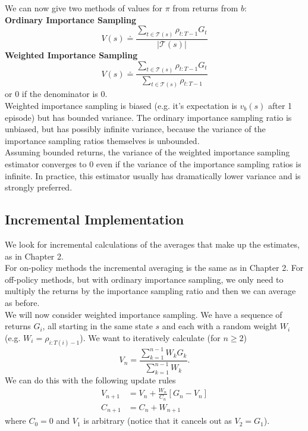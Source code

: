 We can now give two methods of values for $\pi$ from returns from $b$:\\
{\bfseries{Ordinary Importance Sampling}}
\begin{equation}
    V(s) \doteq \frac{\sum_{t\in \mathcal{T}(s)} \rho_{t:T-1}G_t}{|\mathcal{T}(s)|}
\end{equation}
{\bfseries{Weighted Importance Sampling}}
\begin{equation}
    V(s) \doteq \frac{\sum_{t\in \mathcal{T}(s)} \rho_{t:T-1}G_t}{\sum_{t\in \mathcal{T}(s)} \rho_{t:T-1}}
\end{equation}
or 0 if the denominator is 0.\\

Weighted importance sampling is biased (e.g. it's expectation is $v_b(s)$ after 1 episode) but has bounded variance. The ordinary importance sampling ratio is unbiased, but has possibly infinite variance, because the variance of the importance sampling ratios themselves is unbounded.\\

Assuming bounded returns, the variance of the weighted importance sampling estimator converges to 0 even if the variance of the importance sampling ratios is infinite. In practice, this estimator usually has dramatically lower variance and is strongly preferred.

\subsection{Incremental Implementation}
We look for incremental calculations of the averages that make up the estimates, as in Chapter 2.\\

For on-policy methods the incremental averaging is the same as in Chapter 2. For off-policy methods, but with ordinary importance sampling, we only need to multiply the returns by the importance sampling ratio and then we can average as before.\\

We will now consider weighted importance sampling. We have a sequence of returns $G_i$, all starting in the same state $s$ and each with a random weight $W_i$ (e.g. $W_i = \rho_{i:T(i)-1}$). We want to iteratively calculate (for $n \geq 2$)
\[
    V_n = \frac{\sum_{k=1}^{n-1}W_kG_k}{\sum_{k=1}^{n-1}W_k}.
\]
We can do this with the following update rules
\begin{align}
    V_{n+1} &= V_n + \frac{W_n}{C_n}[G_n - V_n]\\
    C_{n+1} &= C_n + W_{n+1}
\end{align}
where $C_0 = 0$ and $V_1$ is arbitrary (notice that it cancels out as $V_2 = G_1$).\\

